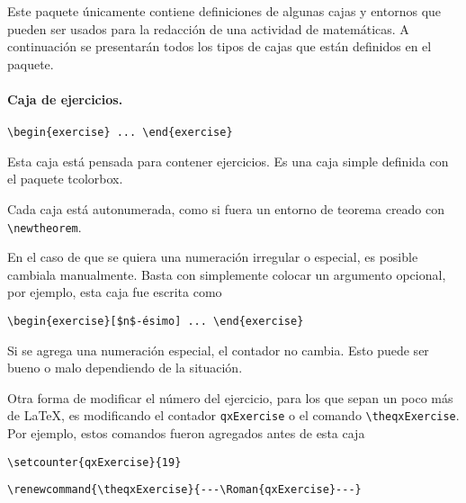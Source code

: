 \documentclass[11pt]{article}
\begin{document}
Este paquete únicamente contiene definiciones de algunas cajas y entornos que pueden ser usados para la redacción de una actividad de matemáticas. A continuación se presentarán todos los tipos de cajas que están definidos en el paquete.


\paragraph{Caja de ejercicios.} \verb|\begin{exercise} ... \end{exercise}|

\begin{exercise}
  Esta caja está pensada para contener ejercicios. Es una caja simple definida con el paquete \textsf{tcolorbox}.
\end{exercise}


\begin{exercise}
  Cada caja está autonumerada, como si fuera un entorno de teorema creado con \verb|\newtheorem|.
\end{exercise}


\begin{exercise}[$n$-ésimo]
  En el caso de que se quiera una numeración irregular o especial, es posible cambiala manualmente. Basta con simplemente colocar un argumento opcional, por ejemplo, esta caja fue escrita como
    
  \verb|\begin{exercise}[$n$-ésimo] ... \end{exercise}|  
\end{exercise}

\begin{exercise}
  Si se agrega una numeración especial, el contador no cambia. Esto puede ser bueno o malo dependiendo de la situación.
\end{exercise}


\setcounter{qxExercise}{19}
\renewcommand{\theqxExercise}{---\Roman{qxExercise}---}

\begin{exercise}
  Otra forma de modificar el número del ejercicio, para los que sepan un poco más de \LaTeX, es modificando el contador \texttt{qxExercise} o el comando \verb|\theqxExercise|. Por ejemplo, estos comandos fueron agregados antes de esta caja

  \verb|\setcounter{qxExercise}{19}|

  \verb|\renewcommand{\theqxExercise}{---\Roman{qxExercise}---}|
\end{exercise}
\end{document}
